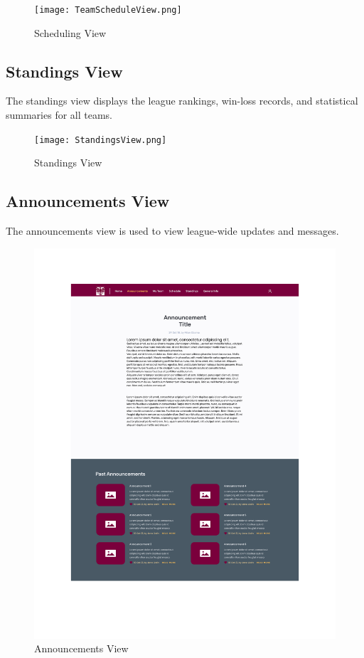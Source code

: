 \documentclass[12pt, titlepage]{article}
\begin{document}
\begin{figure}[H]
  \centering
  \texttt{[image: TeamScheduleView.png]}
  \caption{Scheduling View}
  \label{fig:scheduling_view}
\end{figure}

\newpage

\subsection{Standings View}
The standings view displays the league rankings, win-loss records, and statistical summaries for all teams.

\begin{figure}[H]
  \centering
  \texttt{[image: StandingsView.png]}
  \caption{Standings View}
  \label{fig:standings_view}
\end{figure}

\newpage

\subsection{Announcements View}
The announcements view is used to view league-wide updates and messages.

\begin{figure}[H]
  \centering
  \includegraphics[scale=0.6]{AnnouncementsView.pdf}
  \caption{Announcements View}
  \label{fig:announcements_view}
\end{figure}
\end{document}
